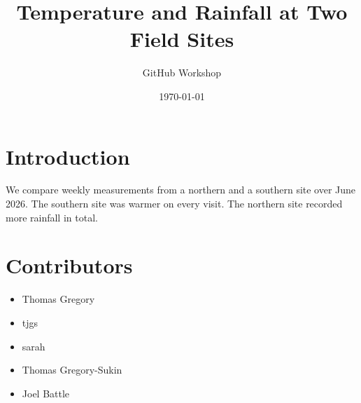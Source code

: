 \documentclass[11pt]{article}
\title{Temperature and Rainfall at Two Field Sites}
\author{GitHub Workshop}
\date{\today}
\begin{document}
\maketitle


\section{Introduction}

We compare weekly measurements from a northern and a southern site over June 2026.
The southern site was warmer on every visit.
The northern site recorded more rainfall in total.

\section{Contributors}


\begin{itemize}
  \item Thomas Gregory
  \item tjgs
  \item sarah
  \item Thomas Gregory-Sukin
  \item Joel Battle
\end{itemize}
\end{document}
